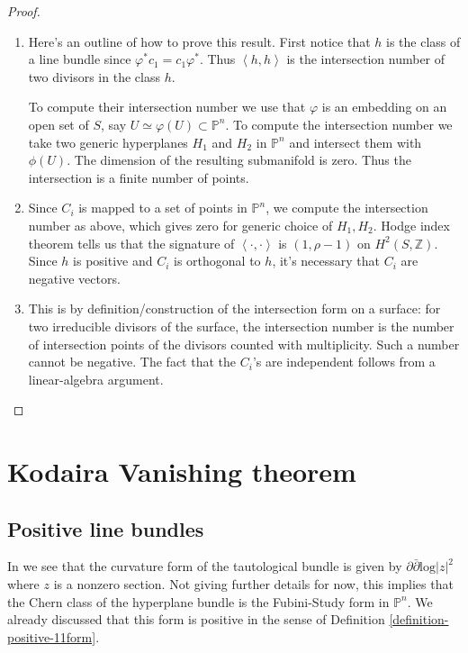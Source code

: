 \begin{proof}
\begin{enumerate}
\item Here's an outline of how to prove this
result.
First notice that $h$ is the class of a line
bundle
since $\varphi^*c_1=c_1\varphi^*$.
Thus $\left\langle{}h,h\right\rangle{}$ is the intersection
number
of two divisors in the class $h$.

To compute their intersection number
we use that $\varphi$ is an embedding on an
open set of $S$,
say $U \simeq \varphi(U) \subset
\mathbb{P}^n$.
To compute the intersection number we take
two generic hyperplanes $H_1$ and $H_2$
in $\mathbb{P}^n$ and intersect them with
$\phi(U)$.
The dimension of the resulting submanifold is
zero.
Thus the intersection is a finite number of
points.

\item Since $C_i$ is mapped to a set of
points in $\mathbb{P}^n$,
we compute the intersection number as above,
which gives zero
for generic choice of $H_1,H_2$. Hodge index
theorem tells us that
the signature of $\left\langle{}\cdot,\cdot\right\rangle{}$
is $(1,\rho-1)$ on
$H^2(S,\mathbb{Z})$. Since $h$ is positive
and $C_i$ is orthogonal to $h$,
it's necessary that $C_i$ are negative
vectors.

\item This is by definition/construction of
the intersection form on a surface:
for two irreducible divisors of the surface,
the intersection number is the number of
intersection points
of the divisors counted with multiplicity.
Such a number cannot be negative.
The fact that the $C_i$'s are independent
follows from a linear-algebra
argument.
\end{enumerate}
\end{proof}

\section{Kodaira Vanishing theorem}
\label{section-kodaira-vanishing}

\subsection{Positive line bundles}
\label{subsection-positive-line-bundles}

\noindent
In \cite[p. 150]{gri}
we see that the curvature form of the
tautological bundle
is given by $\partial\bar\partial \text{log}
|z|^2$
where $z$ is a nonzero section.
Not giving further details for now,
this implies that the Chern class of the
hyperplane bundle
is the Fubini-Study form in $\mathbb{P}^n$.
We already discussed that this form is
positive
in the sense of Definition
\ref{definition-positive-11form}.

